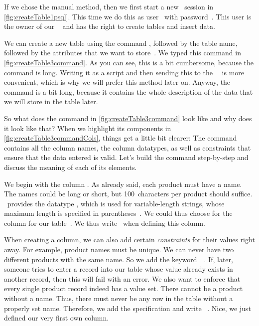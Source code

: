 If we chose the manual method, then we first start a new \psql\ session in \cref{fig:createTable1psql}.
This time we do this as user~ with password~.
This user is the owner of our \db\  and has the right to create tables and insert data.

We can create a new table using the command , followed by the table name, followed by the attributes that we want to store~\cite{PGDG:PD:CT2}.
We typed this command in \cref{fig:createTable3command}.
As you can see, this is a bit cumbersome, because the command is long.
Writing it as a script and then sending this to the \postgresql\ \dbms\ is more convenient, which is why we will prefer this method later on.
Anyway, the command is a bit long, because it contains the whole description of the data that we will store in the table later.

So what does the  command in \cref{fig:createTable3command} look like and why does it look like that?
When we highlight its components in \cref{fig:createTable3commandCols}, things get a little bit clearer:
The command contains all the column names, the column datatypes, as well as constraints that ensure that the data entered is valid.
Let's build the command step-by-step and discuss the meaning of each of its elements.

We begin with the column .
As already said, each product must have a name.
The names could be long or short, but 100~characters per product should suffice.
\sql\ provides the datatype , which is used for variable-length strings, whose maximum length is specified in parentheses~\cite{PGDG:PD:CT}.
We could thus choose  for the column  for our table~.
We thus write~ when defining this column.

When creating a column, we can also add certain \emph{constraints} for their values right away.
For example, product names must be unique.
We can never have two different products with the same name.
So we add the keyword~~\cite{PGDG:PD:C}.
If, later, someone tries to enter a record into our table whose  value already exists in another record, then this will fail with an error.
We also want to enforce that every single product record indeed has a  value set.
There cannot be a product without a name.
Thus, there must never be any row in the table without a properly set name.
Therefore, we add the  specification and write ~\cite{PGDG:PD:C}.
Nice, we just defined our very first own column.

